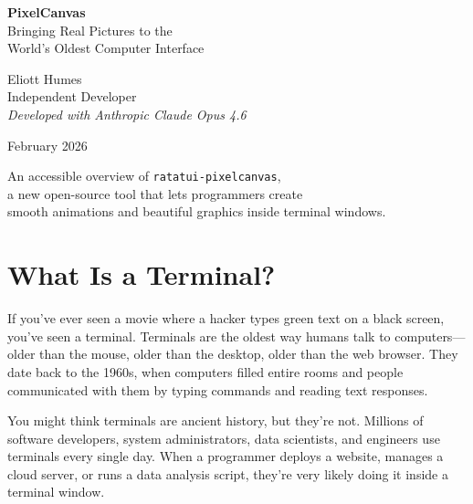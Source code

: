 \documentclass[12pt, a4paper]{article}
\begin{document}
\begin{titlepage}
\centering
\vspace*{3cm}

{\Huge\bfseries\sffamily\color{deepblue} PixelCanvas}\\[0.8em]
{\LARGE\sffamily\color{warmgray} Bringing Real Pictures to the\\World's Oldest Computer Interface}

\vspace{2cm}

{\large\sffamily Eliott Humes}\\[0.4em]
{\normalsize\color{warmgray} Independent Developer}\\[0.3em]
{\small\color{warmgray}\textit{Developed with Anthropic Claude Opus 4.6}}

\vspace{2cm}

{\large February 2026}

\vfill

{\small\color{warmgray}
An accessible overview of \texttt{ratatui-pixelcanvas},\\
a new open-source tool that lets programmers create\\
smooth animations and beautiful graphics inside terminal windows.
}

\vspace{1cm}
\end{titlepage}

\section{What Is a Terminal?}

If you've ever seen a movie where a hacker types green text on a black screen, you've seen a terminal. Terminals are the oldest way humans talk to computers---older than the mouse, older than the desktop, older than the web browser. They date back to the 1960s, when computers filled entire rooms and people communicated with them by typing commands and reading text responses.

You might think terminals are ancient history, but they're not. Millions of software developers, system administrators, data scientists, and engineers use terminals every single day. When a programmer deploys a website, manages a cloud server, or runs a data analysis script, they're very likely doing it inside a terminal window.
\end{document}

